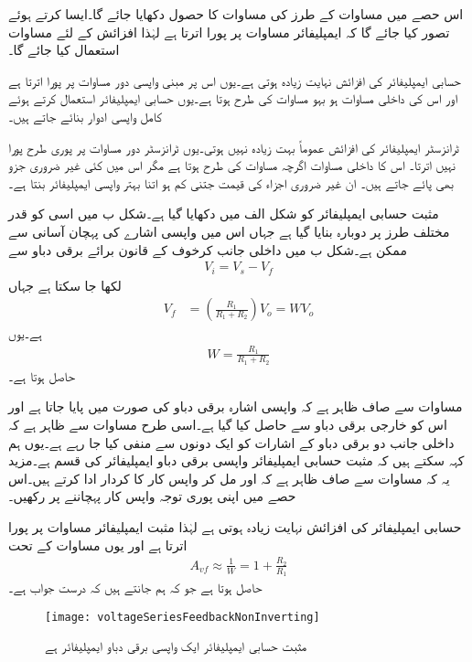 اس حصے میں مساوات  کے طرز کی مساوات کا حصول دکھایا جائے گا۔ایسا کرتے ہوئے تصور کیا جائے گا کہ ایمپلیفائر مساوات  پر پورا اترتا ہے لہٰذا افزائش کے لئے مساوات  استعمال کیا جائے گا۔

حسابی ایمپلیفائر کی افزائش نہایت زیادہ ہوتی ہے۔یوں اس پر مبنی واپسی دور مساوات  پر پورا اترتا ہے اور اس کی داخلی مساوات ہو بہو مساوات  کی طرح ہوتا ہے۔یوں حسابی ایمپلیفائر استعمال کرتے ہوئے کامل واپسی ادوار بنائے جاتے ہیں۔

ٹرانزسٹر ایمپلیفائر کی افزائش عموماً بہت زیادہ نہیں ہوتی۔یوں ٹرانزسٹر دور مساوات  پر پوری طرح پورا نہیں اترتا۔ اس کا داخلی مساوات اگرچہ مساوات  کی طرح ہوتا ہے مگر اس میں کئی غیر ضروری جزو بھی پائے جاتے ہیں۔ ان غیر ضروری اجزاء    کی قیمت جتنی کم ہو اتنا بہتر واپسی ایمپلیفائر بنتا ہے۔


مثبت حسابی ایمپلیفائر کو شکل  الف میں دکھایا گیا ہے۔شکل  ب میں اسی کو قدر مختلف طرز پر دوبارہ بنایا گیا ہے جہاں اس میں واپسی اشارے کی پہچان آسانی سے ممکن ہے۔شکل  ب میں داخلی جانب کرخوف کے قانون برائے برقی دباو سے
\begin{align} \label{مساوات_واپسی_واپسی_برقی_دباو_ایمپلیفائر_کی_جماعت_بندی}
V_i=V_s-V_f
\end{align}
لکھا جا سکتا ہے جہاں
\begin{align} \label{مساوات_واپسی_مثبت_واپس_کار}
V_f &=\left( \frac{R_1}{R_1+R_2} \right) V_o =W V_o
\end{align}
ہے۔یوں
\begin{align}
W =\frac{R_1}{R_1+R_2}
\end{align}
حاصل ہوتا ہے۔

مساوات  سے صاف ظاہر ہے کہ واپسی اشارہ برقی دباو کی صورت میں پایا جاتا ہے اور اس کو خارجی برقی دباو سے حاصل کیا گیا ہے۔اسی طرح مساوات  سے ظاہر ہے کہ داخلی جانب دو برقی دباو کے اشارات کو ایک دونوں سے منفی کیا جا رہے ہے۔یوں  ہم کہہ سکتے ہیں کہ مثبت حسابی ایمپلیفائر واپسی برقی دباو ایمپلیفائر کی قسم ہے۔مزید یہ کہ مساوات  سے صاف ظاہر ہے کہ  اور  مل کر واپس کار کا کردار ادا کرتے ہیں۔اس حصے میں اپنی پوری توجہ واپس کار پہچاننے پر رکھیں۔

حسابی ایمپلیفائر کی افزائش  نہایت زیادہ ہوتی ہے لہٰذا مثبت ایمپلیفائر مساوات   پر پورا اترتا ہے اور یوں مساوات  کے تحت
\begin{align}
A_{vf} \approx \frac{1}{W}=1+\frac{R_2}{R_1}
\end{align}
حاصل ہوتا ہے جو کہ ہم جانتے ہیں کہ درست جواب ہے۔
\begin{figure}
\centering
\texttt{[image: voltageSeriesFeedbackNonInverting]}
\caption{مثبت حسابی ایمپلیفائر ایک واپسی برقی دباو ایمپلیفائر ہے}
\label{شکل_واپسی_مثبت_واپسی_ایمپلیفائر}
\end{figure}

